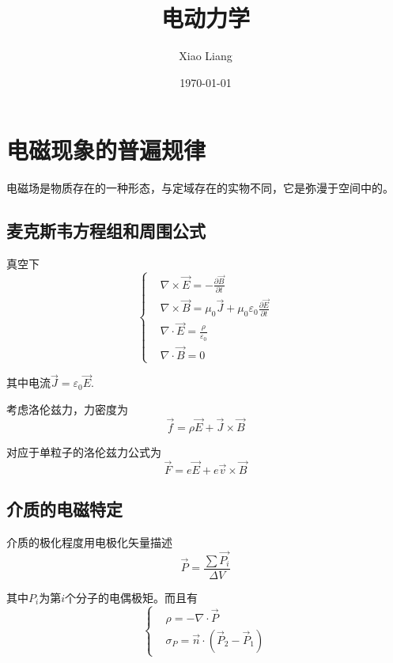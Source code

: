 \documentclass[UTF8]{ctexart}
\title{电动力学}
\author{Xiao Liang}
\date{\today}
\begin{document}
    \maketitle
    \tableofcontents
    \newpage
    \section{电磁现象的普遍规律}
    电磁场是物质存在的一种形态，与定域存在的实物不同，它是弥漫于空间中的。

    \subsection{麦克斯韦方程组和周围公式}
    真空下
    \begin{equation}
        \left \{ \begin{aligned}
            &\nabla \times \vec{E} =-\frac{\partial \vec{B}}{\partial t} \\ &\nabla \times \vec{B} =\mu_{0} \vec{J}+\mu_{0} \varepsilon_{0} \frac{\partial \vec{E}}{\partial t} \\ &\nabla \cdot \vec{E} =\frac{\rho}{\varepsilon_{0}} \\ &\nabla \cdot \vec{B} =0
        \end{aligned} \right.
    \end{equation}

\noindent 其中电流$\vec{J} = \varepsilon_0 \vec{E}$.

    考虑洛伦兹力，力密度为
    \begin{equation}
        \vec{f} = \rho \vec{E} + \vec{J} \times \vec{B}
    \end{equation}

\noindent 对应于单粒子的洛伦兹力公式为
\begin{equation}
    \vec{F} = e \vec{E} + e \vec{v} \times \vec{B}
\end{equation}

    \subsection{介质的电磁特定}
    介质的极化程度用电极化矢量描述
    \begin{equation}
        \vec{P} = \frac{\sum \vec{P_i}}{\Delta V}
    \end{equation}

\noindent 其中$P_i$为第$i$个分子的电偶极矩。而且有
\begin{equation}
    \left \{ \begin{aligned}
        &\rho = - \nabla \cdot \vec{P} \\
        &\sigma_{P} = \vec{n} \cdot (\vec{P}_2 - \vec{P}_1) 
    \end{aligned} \right.
\end{equation}
\end{document}
